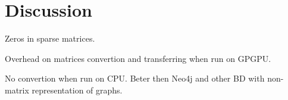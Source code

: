 \section{Discussion}

Zeros in sparse matrices.

Overhead on matrices convertion and transferring when run on GPGPU.

No convertion when run on CPU. Beter then Neo4j and other BD with non-matrix representation of graphs.
